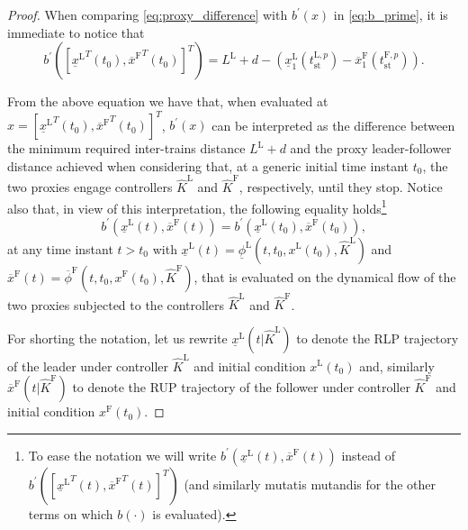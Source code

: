 \begin{theorem}
\begin{proof}
		When comparing \eqref{eq:proxy_difference} with $b^\prime(x)$ in \eqref{eq:b_prime}, it is immediate to notice that 
		\begin{equation}\label{eq:equality_b_prime}
			b^\prime([{\underline{x}^\mathrm{L}}^T(t_0),{\overline{x}^\mathrm{F}}^T(t_0)]^T)=L^\mathrm{L}+d-\left(\underline{x}_1^\mathrm{L}(t_{\mathrm{st}}^{\mathrm{L},p} ) -\overline{x}_1^\mathrm{F}(t_{\mathrm{st}}^{\mathrm{F},p}  )\right).
		\end{equation}
		
		From the above equation we have that, when evaluated at $x=[{\underline{x}^\mathrm{L}}^T(t_0),{\overline{x}^\mathrm{F}}^T(t_0)]^T$,  $b^\prime(x)$ can be interpreted as the difference between the minimum required inter-trains distance $L^\mathrm{L}+d$ and the proxy leader-follower distance achieved when considering that, at a generic initial time instant $t_0$, the two proxies engage controllers $\hat{K}^\mathrm{L}$ and $\hat{K}^\mathrm{F}$, respectively, until they stop. 
		Notice also that, in view of this interpretation, the following equality holds\footnote{To ease the notation we will write $b^\prime(\underline{x}^\mathrm{L}(t),\overline{x}^\mathrm{F}(t))$ instead of $b^\prime([{\underline{x}^\mathrm{L}}^T(t),{\overline{x}^\mathrm{F}}^T(t)]^T)$ (and similarly mutatis mutandis for the other terms on which $b(\cdot)$ is evaluated).}
		\begin{equation}\label{eq:constantb_prime}
			b^\prime(\underline{x}^\mathrm{L}(t),\overline{x}^\mathrm{F}(t))=b^\prime(\underline{x}^\mathrm{L}(t_0),\overline{x}^\mathrm{F}(t_0)),
		\end{equation}
		at any time instant $t>t_0$ with  $\underline{x}^\mathrm{L}(t)=\underline{\phi}^\mathrm{L}(t,t_0,x^\mathrm{L}(t_0),\hat{K}^\mathrm{L})$ and $\overline{x}^\mathrm{F}(t)=\overline{\phi}^\mathrm{F}(t,t_0,x^\mathrm{F}(t_0),\hat{K}^\mathrm{F})$, that is evaluated on the dynamical flow of the two proxies subjected to the controllers $\hat{K}^\mathrm{L}$ and $\hat{K}^\mathrm{F}$.
		
		For shorting the notation, let us rewrite $\underline{x}^\mathrm{L}(t | \hat{K}^\mathrm{L})$ to denote the RLP trajectory of the leader under controller $\hat{K}^\mathrm{L}$ and initial condition $x^\mathrm{L}(t_0)$ and, similarly  $\overline{x}^\mathrm{F}(t | \hat{K}^\mathrm{F})$ to denote the RUP trajectory of the follower under controller $\hat{K}^\mathrm{F}$ and initial condition $x^\mathrm{F}(t_0)$. 
		

\end{proof}
\end{theorem}
